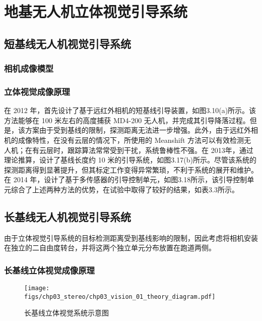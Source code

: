 \chapter{地基无人机立体视觉引导系统}

\section{短基线无人机视觉引导系统}
\subsection{相机成像模型}

\subsection{立体视觉成像原理}



在 2012 年，首先设计了基于远红外相机的短基线引导装置，如图3.10(a)所示。该方法能够在 100 米左右的高度捕获 MD4-200 无人机，并完成其引导降落过程。但是，该方案由于受到基线的限制，探测距离无法进一步增强。此外，由于远红外相机的成像特性，在没有云层的情况下，所使用的 Meanshift 方法可以有效检测无人机；在有云层时，跟踪算法常常受到干扰，系统鲁棒性不强。在 2013年，通过理论推算，设计了基线长度约 10 米的引导系统，如图3.17(b)所示。尽管该系统的探测距离得到显著提升，但其标定工作变得异常繁琐，不利于系统的展开和维护。在 2014 年，设计了基于多传感器的引导控制单元，如图3.18所示，该引导控制单元综合了上述两种方法的优势，在试验中取得了较好的结果，如表3.3所示。

\section{长基线无人机视觉引导系统}
由于立体视觉引导系统的目标检测距离受到基线影响的限制，因此考虑将相机安装在独立的二自由度转台，并将这两个独立单元分布放置在跑道两侧。



\subsection{长基线立体视觉成像原理}



\begin{figure}[!tb]
	\centering
	\texttt{[image: figs/chp03\_stereo/chp03\_vision\_01\_theory\_diagram.pdf]}	
	\caption{长基线立体视觉系统示意图}
	\label{fig:chp03_vision_01_theory_diagram}
\end{figure}

